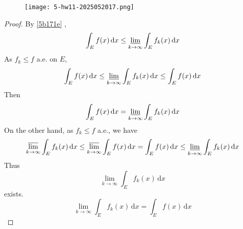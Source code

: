 \begin{exercise}
\begin{figure}[H]
\centering
\texttt{[image: 5-hw11-2025052017.png]}
\label{}
\end{figure}
\end{exercise}
\begin{proof}
By \cref{5b171e} ,
\[
\int_{E}^{} f(x) \, \mathrm{d}x \leq \varliminf_{ k \to \infty } \int_{E}^{} f_k(x) \, \mathrm{d}x
\]
As $f_k\leq f$ a.e. on $E$,
\[
\int_{E}^{} f(x) \, \mathrm{d}x \leq \varliminf_{ k \to \infty } \int_{E}^{} f_k(x) \, \mathrm{d}x \leq \int_{E}^{} f(x) \, \mathrm{d}x
\]
Then
\[
\int_{E}^{} f(x) \, \mathrm{d}x =\varliminf_{ k \to \infty } \int_{E}^{} f_k(x) \, \mathrm{d}x
\]
On the other hand, as $f_k\leq f$ a.e., we have
\[
\varlimsup_{ k \to \infty } \int_{E}^{} f_k(x) \, \mathrm{d}x \leq \varlimsup_{ k \to \infty } \int_{E}^{} f(x) \, \mathrm{d}x =\int_{E}^{} f(x) \, \mathrm{d}x \leq \varliminf_{ k \to \infty } \int_{E}^{} f_k(x) \, \mathrm{d}x
\]
Thus
\[
\lim_{ k \to \infty } \int_{E}^{} f_k(x) \, \mathrm{d}x
\]
exists.
\[
\lim_{ k \to \infty } \int_{E}^{} f_k(x) \, \mathrm{d}x =\int_{E}^{} f(x) \, \mathrm{d}x
\]
\end{proof}


